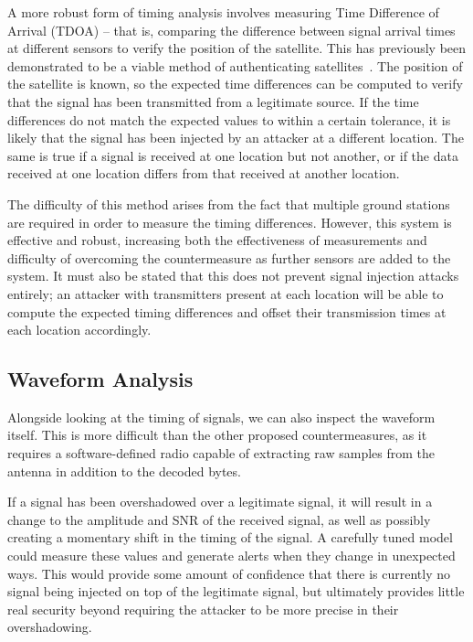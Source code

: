 A more robust form of timing analysis involves measuring Time Difference of Arrival (TDOA) -- that is, comparing the difference between signal arrival times at different sensors to verify the position of the satellite.
This has previously been demonstrated to be a viable method of authenticating satellites~\cite{jedermann2021orbit}.
The position of the satellite is known, so the expected time differences can be computed to verify that the signal has been transmitted from a legitimate source.
If the time differences do not match the expected values to within a certain tolerance, it is likely that the signal has been injected by an attacker at a different location.
The same is true if a signal is received at one location but not another, or if the data received at one location differs from that received at another location.

The difficulty of this method arises from the fact that multiple ground stations are required in order to measure the timing differences.
However, this system is effective and robust, increasing both the effectiveness of measurements and difficulty of overcoming the countermeasure as further sensors are added to the system.
It must also be stated that this does not prevent signal injection attacks entirely; an attacker with transmitters present at each location will be able to compute the expected timing differences and offset their transmission times at each location accordingly.


\subsection{Waveform Analysis}

Alongside looking at the timing of signals, we can also inspect the waveform itself.
This is more difficult than the other proposed countermeasures, as it requires a software-defined radio capable of extracting raw samples from the antenna in addition to the decoded bytes.

If a signal has been overshadowed over a legitimate signal, it will result in a change to the amplitude and SNR of the received signal, as well as possibly creating a momentary shift in the timing of the signal.
A carefully tuned model could measure these values and generate alerts when they change in unexpected ways.
This would provide some amount of confidence that there is currently no signal being injected on top of the legitimate signal, but ultimately provides little real security beyond requiring the attacker to be more precise in their overshadowing.

